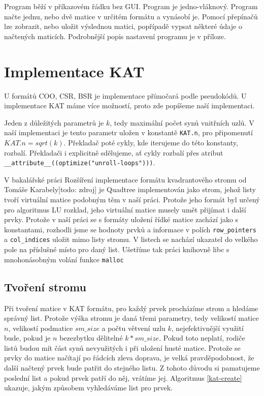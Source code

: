 Program běží v příkazovém řádku bez GUI. Program je jedno-vláknový. Program načte jednu, nebo dvě matice v určitém formátu a vynásobí je. Pomocí přepínačů lze zobrazit, nebo uložit výslednou matici, popřípadě vypsat některé údaje o načtených maticích. Podrobnější popis nastavení programu je v příloze.


\section{Implementace KAT}

U formátů COO, CSR, BSR je implementace přímočará podle pseudokódů. U implementace KAT máme více možností, proto zde popíšeme naší implementaci.

Jeden z důležitých parametrů je $k$, tedy maximální počet synů vnitřních uzlů. V naší implementaci je tento parametr uložen v konstantě \texttt{KAT.n}, pro připomenutí $KAT.n = sqrt(k)$. Překladač poté cykly, kde iterujeme do této konstanty, rozbalí. Překladači i explicitně sdělujeme, ať cykly rozbalí přes atribut \texttt{\_\_attribute\_\_((optimize("unroll-loops")))}.

V bakalářské práci Rozšíření implementace formátu kvadrantového stromu od Tomáše Karabely[todo: zdroj] je Quadtree implementován jako strom, jehož listy tvoří virtuální matice podobným těm v naší práci. Protože jeho formát byl určený pro algoritmus LU rozklad, jeho virtuální matice musely umět přijímat i další prvky. Protože v naší práci se s formáty uložení řídké matice zachází jako s konstantami, rozhodli jsme se hodnoty prvků a informace v polích \texttt{row\_pointers} a \texttt{col\_indices} uložit mimo listy stromu. V listech se nachází ukazatel do velkého pole na příslušné místo pro daný list. Ušetříme tak práci knihovně libc s mnohonásobným volání funkce \texttt{malloc}

\subsection{Tvoření stromu}

Při tvoření matice v KAT formátu, pro každý prvek procházíme strom a hledáme správný list. Protože výška stromu je daná třemi parametry, tedy velikostí matice $n$, velikostí podmatice $sm\_size$ a počtu větvení uzlu $k$, nejefektivnější využití bude, pokud je $n$ bezezbytku dělitelné $k * sm\_size$. Pokud toto neplatí, rodiče listů budou mít část synů nevyužitých i při uložení husté matice. Protože se prvky do matice načítají po řádcích zleva doprava, je velká pravděpodobnost, že další načtený prvek bude patřit do stejného listu. Z tohoto důvodu si pamatujeme poslední list a pokud prvek patří do něj, vrátíme jej. Algoritmus \ref{kat-create} ukazuje, jakým způsobem vyhledáváme list pro prvek.


